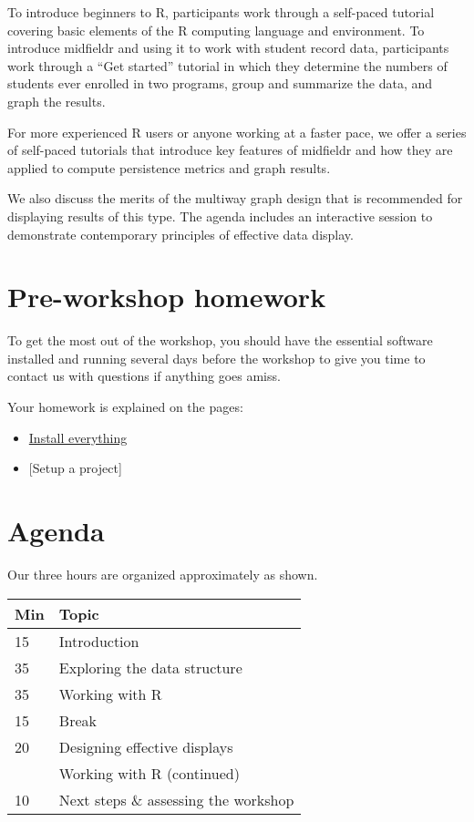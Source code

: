 \documentclass[
]{book}
\providecommand{\tightlist}{%
  \setlength{\itemsep}{0pt}\setlength{\parskip}{0pt}}
\begin{document}
To introduce beginners to R, participants work through a self-paced tutorial covering basic elements of the R computing language and environment. To introduce midfieldr and using it to work with student record data, participants work through a ``Get started'' tutorial in which they determine the numbers of students ever enrolled in two programs, group and summarize the data, and graph the results.

For more experienced R users or anyone working at a faster pace, we offer a series of self-paced tutorials that introduce key features of midfieldr and how they are applied to compute persistence metrics and graph results.

We also discuss the merits of the multiway graph design that is recommended for displaying results of this type. The agenda includes an interactive session to demonstrate contemporary principles of effective data display.

\hypertarget{pre-workshop-homework}{%
\section{Pre-workshop homework}\label{pre-workshop-homework}}

To get the most out of the workshop, you should have the essential software installed and running several days before the workshop to give you time to contact us with questions if anything goes amiss.

Your homework is explained on the pages:

\begin{itemize}
\tightlist
\item
  \protect\hyperlink{install-everything}{Install everything}
\item
  {[}Setup a project{]}
\end{itemize}

\hypertarget{agenda}{%
\section{Agenda}\label{agenda}}

Our three hours are organized approximately as shown.

\begin{tabular}{ll}
\toprule
Min & Topic\\
\midrule
15 & Introduction\\
35 & Exploring the data structure\\
35 & Working with R\\
15 & Break\\
20 & Designing effective displays\\
\addlinespace
50 & Working with R (continued)\\
10 & Next steps \& assessing the workshop\\
\bottomrule
\end{tabular}
\end{document}
